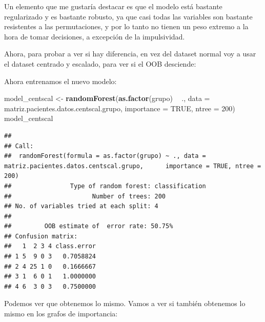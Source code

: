 \documentclass[]{article}
\newenvironment{Shaded}{\begin{snugshade}}{\end{snugshade}}
\newcommand{\KeywordTok}[1]{\textcolor[rgb]{0.13,0.29,0.53}{\textbf{#1}}}
\newcommand{\DataTypeTok}[1]{\textcolor[rgb]{0.13,0.29,0.53}{#1}}
\newcommand{\DecValTok}[1]{\textcolor[rgb]{0.00,0.00,0.81}{#1}}
\newcommand{\StringTok}[1]{\textcolor[rgb]{0.31,0.60,0.02}{#1}}
\newcommand{\CommentTok}[1]{\textcolor[rgb]{0.56,0.35,0.01}{\textit{#1}}}
\newcommand{\OtherTok}[1]{\textcolor[rgb]{0.56,0.35,0.01}{#1}}
\newcommand{\OperatorTok}[1]{\textcolor[rgb]{0.81,0.36,0.00}{\textbf{#1}}}
\newcommand{\NormalTok}[1]{#1}
\begin{document}
Un elemento que me gustaría destacar es que el modelo está bastante
regularizado y es bastante robusto, ya que casi todas las variables son
bastante resistentes a las permutaciones, y por lo tanto no tienen un
peso extremo a la hora de tomar decisiones, a excepción de la
impulsividad.

Ahora, para probar a ver si hay diferencia, en vez del dataset normal
voy a usar el dataset centrado y escalado, para ver si el OOB desciende:

\begin{Shaded}
\end{Shaded}

Ahora entrenamos el nuevo modelo:

\begin{Shaded}
\begin{Highlighting}[]
\NormalTok{model_centscal <-}\StringTok{ }\KeywordTok{randomForest}\NormalTok{(}\KeywordTok{as.factor}\NormalTok{(grupo) }\OperatorTok{~}\StringTok{ }\NormalTok{., }\DataTypeTok{data =}\NormalTok{ matriz.pacientes.datos.centscal.grupo, }\DataTypeTok{importance =} \OtherTok{TRUE}\NormalTok{, }\DataTypeTok{ntree =} \DecValTok{200}\NormalTok{)}
\NormalTok{model_centscal}
\end{Highlighting}
\end{Shaded}

\begin{verbatim}
## 
## Call:
##  randomForest(formula = as.factor(grupo) ~ ., data = matriz.pacientes.datos.centscal.grupo,      importance = TRUE, ntree = 200) 
##                Type of random forest: classification
##                      Number of trees: 200
## No. of variables tried at each split: 4
## 
##         OOB estimate of  error rate: 50.75%
## Confusion matrix:
##   1  2 3 4 class.error
## 1 5  9 0 3   0.7058824
## 2 4 25 1 0   0.1666667
## 3 1  6 0 1   1.0000000
## 4 6  3 0 3   0.7500000
\end{verbatim}

Podemos ver que obtenemos lo mismo. Vamos a ver si también obtenemos lo
mismo en los grafos de importancia:
\end{document}
